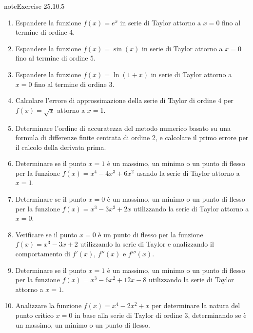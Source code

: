 \documentclass[letterpaper,10pt,italian]{jupyterBook}
\begin{document}
\begin{sphinxadmonition}{note}{Exercise 25.10.5}


\begin{enumerate}
%
\item {} 
\sphinxAtStartPar
Espandere la funzione \(f(x) = e^x\) in serie di Taylor attorno a \(x = 0\) fino al termine di ordine 4.

\item {} 
\sphinxAtStartPar
Espandere la funzione \(f(x) = \sin(x)\) in serie di Taylor attorno a \(x = 0\) fino al termine di ordine 5.

\item {} 
\sphinxAtStartPar
Espandere la funzione \(f(x) = \ln(1 + x)\) in serie di Taylor attorno a \(x = 0\) fino al termine di ordine 3.

\item {} 
\sphinxAtStartPar
Calcolare l’errore di approssimazione della serie di Taylor di ordine 4 per \(f(x) = \sqrt{x}\) attorno a \(x = 1\).

\item {} 
\sphinxAtStartPar
Determinare l’ordine di accuratezza del metodo numerico basato su una formula di differenze finite centrata di ordine 2, e calcolare il primo errore per il calcolo della derivata prima.

\item {} 
\sphinxAtStartPar
Determinare se il punto \(x = 1\) è un massimo, un minimo o un punto di flesso per la funzione \(f(x) = x^4 - 4x^3 + 6x^2\) usando la serie di Taylor attorno a \(x = 1\).

\item {} 
\sphinxAtStartPar
Determinare se il punto \(x = 0\) è un massimo, un minimo o un punto di flesso per la funzione \(f(x) = x^3 - 3x^2 + 2x\) utilizzando la serie di Taylor attorno a \(x = 0\).

\item {} 
\sphinxAtStartPar
Verificare se il punto \(x = 0\) è un punto di flesso per la funzione \(f(x) = x^3 - 3x + 2\) utilizzando la serie di Taylor e analizzando il comportamento di \(f'(x)\), \(f''(x)\) e \(f'''(x)\).

\item {} 
\sphinxAtStartPar
Determinare se il punto \(x = 1\) è un massimo, un minimo o un punto di flesso per la funzione \(f(x) = x^3 - 6x^2 + 12x - 8\) utilizzando la serie di Taylor attorno a \(x = 1\).

\item {} 
\sphinxAtStartPar
Analizzare la funzione \(f(x) = x^4 - 2x^2 + x\) per determinare la natura del punto critico \(x = 0\) in base alla serie di Taylor di ordine 3, determinando se è un massimo, un minimo o un punto di flesso.

\end{enumerate}
\end{sphinxadmonition}
\end{document}
